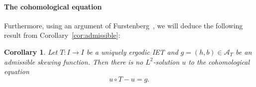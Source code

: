 \documentclass{amsart}
\newtheorem{corollary}[theorem]{Corollary}
\theoremstyle{definition}
\theoremstyle{remark}
\numberwithin{equation}{section}
\newcommand{\<}{{\langle}}
\renewcommand{\>}{{\rangle}}
\newcommand{\francisco}[1]{{\color{red} \sf  F: [#1]}}
\newcommand{\jayadev}[1]{{\color{purple} \sf  J: [#1]}}
\begin{document}
\paragraph*{\bf The cohomological equation} Furthermore, using an argument of Furstenberg~\cite{Fu61}, we will deduce the following result from Corollary~\ref{cor:admissible}:

\begin{corollary}\label{cor:cohomological} Let $T: I \rightarrow I$ be a uniquely ergodic IET and $g = (h, b) \in \mathcal A_T$ be an admissible skewing function. Then there is no $L^2$-solution $u$ to the cohomological equation \begin{equation}\label{eq:cohom} u\circ T - u = g.\end{equation}
\end{corollary}


\end{document}

